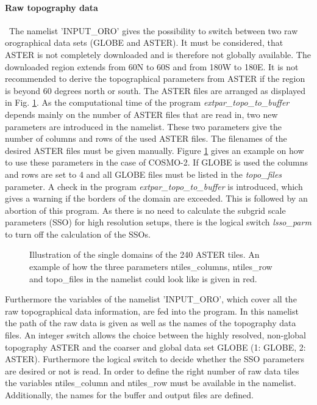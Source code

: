 \documentclass[a4paper,10pt,DIV14,BCOR1cm,titlepage,twoside]{scrartcl}
\begin{document}
\paragraph{Raw topography data}\ 
The namelist 'INPUT\_ORO' gives the possibility to switch between two raw orographical data sets (GLOBE and ASTER). It must be considered, that ASTER is not completely downloaded and is therefore not globally available. The downloaded region extends from 60\textdegree N to 60\textdegree S and from 180\textdegree W to 180\textdegree E. It is not recommended to derive the topographical parameters from ASTER if the region is beyond 60 degrees north or south. The ASTER files are arranged as displayed in Fig. \ref{fig:ASTER_files}. As the computational time of the program \textit{extpar\_topo\_to\_buffer} depends mainly on the number of ASTER files that are read in, two new parameters are introduced in the namelist. These two parameters give the number of columns and rows of the used ASTER files. The filenames of the desired ASTER files must be given manually. Figure \ref{fig:ASTER_files} gives an example on how to use these parameters in the case of COSMO-2. If GLOBE is used the columns and rows are set to 4 and all GLOBE files must be listed in the \textit{topo\_files} parameter. A check in the program \textit{extpar\_topo\_to\_buffer} is introduced, which gives a warning if the borders of the domain are exceeded. This is followed by an abortion of this program. As there is no need to calculate the subgrid scale parameters (SSO) for high resolution setups, there is the logical switch \textit{lsso\_parm} to turn off the calculation of the SSOs.\par\medskip
\pgfdeclareimage[interpolate=true, height = 13.5cm]{ASTER_files}{ASTER_files}
\begin{figure}[hb!]
\begin{pgfpicture}{0cm}{0cm}{16cm}{12cm}
 \end{pgfpicture}
\caption{\label{fig:ASTER_files}Illustration of the single domains of the 240 ASTER tiles. An example of how the three parameters ntiles\_columns, ntiles\_row and topo\_files in the namelist could look like is given in red.}	
\end{figure}
Furthermore the variables of the namelist 'INPUT\_ORO', which cover all the raw topographical data information, are fed into the program. In this namelist the path of the raw data is given as well as the names of the topography data files. An integer switch allows the choice between the highly resolved, non-global topography ASTER and the coarser and global data set GLOBE (1: GLOBE, 2: ASTER). Furthermore the logical switch to decide whether the SSO parameters are desired or not is read. In order to define the right number of raw data tiles the variables ntiles\_column and ntiles\_row must be available in the namelist. Additionally, the names for the buffer and output files are defined.\par\medskip\noindent
\end{document}
